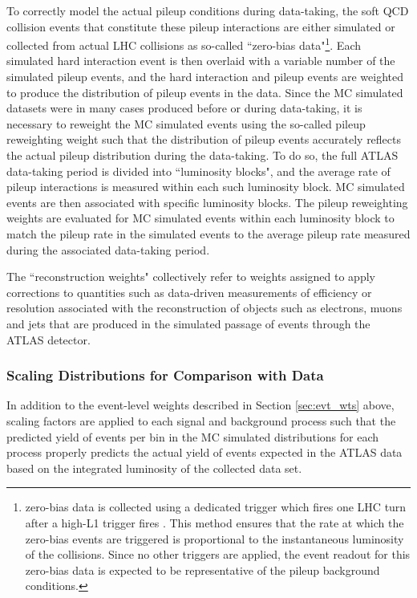 To correctly model the actual pileup conditions during data-taking, the soft QCD collision events that constitute these pileup interactions are either simulated \cite{MC_overlay_pileup} or collected from actual LHC collisions as so-called ``zero-bias data"\footnote{zero-bias data is collected using a dedicated trigger which fires one LHC turn after a high-\pt L1 trigger fires \cite{data_overlay_pileup}. This method ensures that the rate at which the zero-bias events are triggered is proportional to the instantaneous luminosity of the collisions. Since no other triggers are applied, the event readout for this zero-bias data is expected to be representative of the pileup background conditions.}. Each simulated hard interaction event is then overlaid with a variable number of the simulated pileup events, and the hard interaction and pileup events are weighted to produce the distribution of pileup events in the data. Since the MC simulated datasets were in many cases produced before or during data-taking, it is necessary to reweight the MC simulated events using the so-called pileup reweighting weight such that the distribution of pileup events accurately reflects the actual pileup distribution during the data-taking. To do so, the full ATLAS data-taking period is divided into ``luminosity blocks", and the average rate of pileup interactions is measured within each such luminosity block. MC simulated events are then associated with specific luminosity blocks. The pileup reweighting weights are evaluated for MC simulated events within each luminosity block to match the pileup rate in the simulated events to the average pileup rate measured during the associated data-taking period.

The ``reconstruction weights" collectively refer to weights assigned to apply corrections to quantities such as data-driven measurements of efficiency or resolution associated with the reconstruction of objects such as electrons, muons and jets that are produced in the simulated passage of events through the ATLAS detector.

\subsubsection{Scaling Distributions for Comparison with Data}

In addition to the event-level weights described in Section \ref{sec:evt_wts} above, scaling factors are applied to each signal and background process such that the predicted yield of events per bin in the MC simulated distributions for each process properly predicts the actual yield of events expected in the ATLAS data based on the integrated luminosity of the collected data set.

